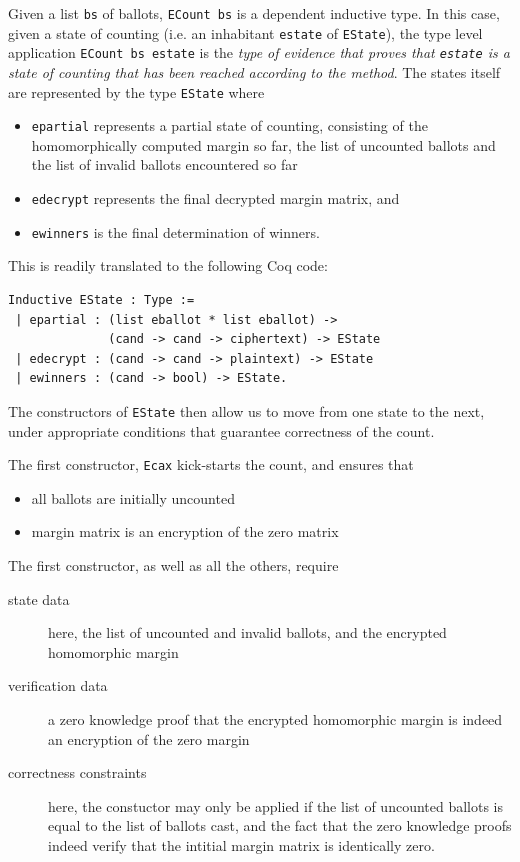   \noindent
  Given a list \texttt{bs} of ballots, \texttt{ECount bs} is a
  dependent inductive type. In this case, given a state of counting
  (i.e. an inhabitant \texttt{estate} of \texttt{EState}), the type level application
  \texttt{ECount bs estate} is the \emph{type of evidence that proves
  that \texttt{estate} is a state of counting that has been reached
  according to the method}.  The states itself are represented by
  the type \texttt{EState}
where
\begin{itemize}
 \item \texttt{epartial} represents a partial state of counting,
 consisting of the homomorphically computed margin so far, the list
 of uncounted ballots and the list of invalid ballots encountered so
 far
 \item \texttt{edecrypt} represents the final decrypted margin
 matrix, and 
 \item \texttt{ewinners} is the final determination of winners. 
\end{itemize}
This is readily translated to the following Coq code:
\begin{lstlisting}[frame=single,basicstyle=\ttfamily\footnotesize]
Inductive EState : Type :=
 | epartial : (list eballot * list eballot) ->
              (cand -> cand -> ciphertext) -> EState
 | edecrypt : (cand -> cand -> plaintext) -> EState
 | ewinners : (cand -> bool) -> EState.
\end{lstlisting}

\noindent
The constructors of \texttt{EState} then allow us to move from one
state to the next, under appropriate conditions that guarantee
correctness of the count.

The first constructor, \texttt{Ecax} kick-starts the count, and
ensures that 
\begin{itemize}
  \item all ballots are initially uncounted
  \item margin matrix is an encryption of the zero matrix
\end{itemize}
The first constructor, as well as all the others, require
\begin{description}
  \item[state data] here, the list of uncounted and invalid ballots,
  and the encrypted homomorphic margin
  \item[verification data] a zero knowledge proof that the encrypted
  homomorphic margin is indeed an encryption of the zero margin
  \item[correctness constraints] here, the constuctor may only be applied if
  the list of uncounted ballots is equal to the list of ballots
  cast, and the fact that the zero knowledge proofs indeed verify
  that the intitial margin matrix is identically zero.
\end{description}

